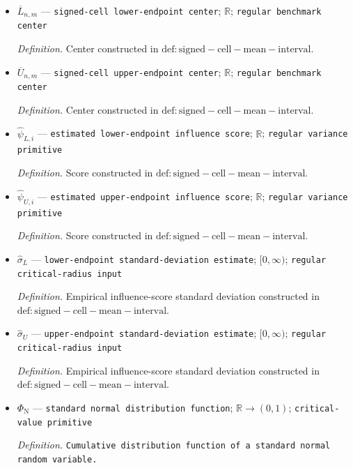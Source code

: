 \documentclass{article}
\begin{document}
\begin{itemize}
  \par\smallskip\noindent\emph{Definition.} Sign estimate constructed from \(\overline h_{v,j}\) in \(\mathrm{def:signed-cell-mean-interval}\), with ties assigned sign \(1\).
  \item \(\overline L_{n,m}\) --- \texttt{signed-\allowbreak{}cell lower-\allowbreak{}endpoint center}; \(\mathbb R\); \texttt{regular benchmark center}
  \par\smallskip\noindent\emph{Definition.} Center constructed in \(\mathrm{def:signed-cell-mean-interval}\).
  \item \(\overline U_{n,m}\) --- \texttt{signed-\allowbreak{}cell upper-\allowbreak{}endpoint center}; \(\mathbb R\); \texttt{regular benchmark center}
  \par\smallskip\noindent\emph{Definition.} Center constructed in \(\mathrm{def:signed-cell-mean-interval}\).
  \item \(\widehat\psi_{L,i}\) --- \texttt{estimated lower-\allowbreak{}endpoint influence score}; \(\mathbb R\); \texttt{regular variance primitive}
  \par\smallskip\noindent\emph{Definition.} Score constructed in \(\mathrm{def:signed-cell-mean-interval}\).
  \item \(\widehat\psi_{U,i}\) --- \texttt{estimated upper-\allowbreak{}endpoint influence score}; \(\mathbb R\); \texttt{regular variance primitive}
  \par\smallskip\noindent\emph{Definition.} Score constructed in \(\mathrm{def:signed-cell-mean-interval}\).
  \item \(\widehat\sigma_L\) --- \texttt{lower-\allowbreak{}endpoint standard-\allowbreak{}deviation estimate}; \([0,\infty)\); \texttt{regular critical-\allowbreak{}radius input}
  \par\smallskip\noindent\emph{Definition.} Empirical influence-score standard deviation constructed in \(\mathrm{def:signed-cell-mean-interval}\).
  \item \(\widehat\sigma_U\) --- \texttt{upper-\allowbreak{}endpoint standard-\allowbreak{}deviation estimate}; \([0,\infty)\); \texttt{regular critical-\allowbreak{}radius input}
  \par\smallskip\noindent\emph{Definition.} Empirical influence-score standard deviation constructed in \(\mathrm{def:signed-cell-mean-interval}\).
  \item \(\Phi_{\mathrm N}\) --- \texttt{standard normal distribution function}; \(\mathbb R\to(0,1)\); \texttt{critical-\allowbreak{}value primitive}
  \par\smallskip\noindent\emph{Definition.} \texttt{Cumulative distribution function of a standard normal random variable.}

\end{itemize}
\end{document}
